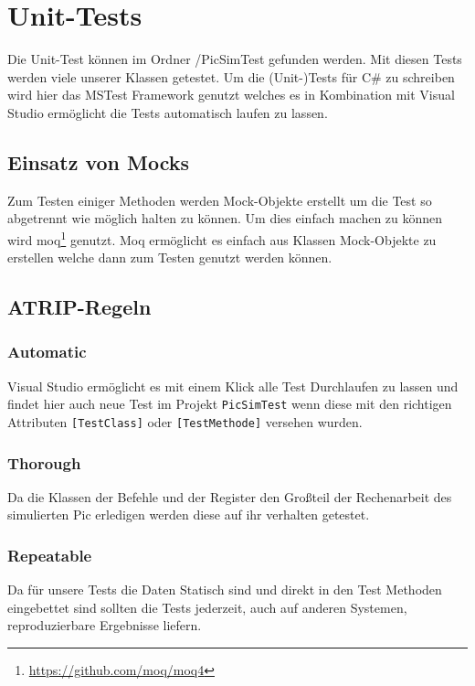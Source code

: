 \documentclass[12pt,a4paper,titlepage,ngerman,pdftex]{report}
\begin{document}
    \section{Unit-Tests}
    Die Unit-Test können im Ordner /PicSimTest gefunden werden. 
	Mit diesen Tests werden viele unserer Klassen getestet.
	Um die (Unit-)Tests für C\# zu schreiben wird hier das MSTest Framework genutzt welches es in Kombination mit Visual Studio ermöglicht die Tests automatisch laufen zu lassen.
    \subsection{Einsatz von Mocks}
    Zum Testen einiger Methoden werden Mock-Objekte erstellt um die Test so abgetrennt wie möglich halten zu können.
	Um dies einfach machen zu können wird moq\footnote{\url{https://github.com/moq/moq4}} genutzt.
	Moq ermöglicht es einfach aus Klassen Mock-Objekte zu erstellen welche dann zum Testen genutzt werden können.
	
    \subsection{ATRIP-Regeln}
	\label{subsec:atrip-regeln}

    \subsubsection{Automatic}
	Visual Studio ermöglicht es mit einem Klick alle Test Durchlaufen zu lassen und findet hier auch neue Test im Projekt \verb|PicSimTest| wenn diese mit den richtigen Attributen \verb|[TestClass]| oder \verb|[TestMethode]| versehen wurden.
	
    \subsubsection{Thorough}\label{subsec:thorough}
    Da die Klassen der Befehle und der Register den Großteil der Rechenarbeit des simulierten Pic erledigen werden diese auf ihr verhalten getestet.
    

    \subsubsection{Repeatable}
    Da für unsere Tests die Daten Statisch sind und direkt in den Test Methoden eingebettet sind sollten die Tests jederzeit,  auch auf anderen Systemen, reproduzierbare Ergebnisse liefern.
\end{document}

